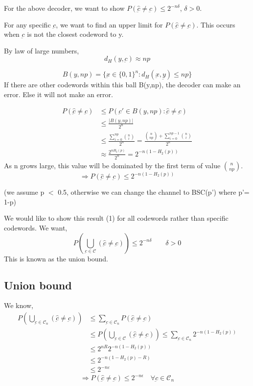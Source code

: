 \documentclass{article}
\begin{document}
For the above decoder, we want to show $P( \hat{\underbar{c}} \neq \underbar{c}) \leq 2^{-n \delta}$, $\delta >0$.

For any specific $\underbar{c}$, we want to find an upper limit for $P(\hat{\underbar{c}} \neq \underbar{c})$. This occurs when $\underbar{c}$ is not the closest codeword to y.

By law of large numbers,
$$ d_H (y, \underbar{c}) \approx np$$

$$ B(y,np)= \{ \underbar{x} \in \{ 0,1 \}^n : d_H (\underbar{x}, \underbar{y}) \leq np \}$$
If there are other codewords within this ball B(y,np), the decoder can make an error. Else it will not make an error.

\begin{align*}
P(\hat{\underbar{c}} \neq \underbar{c}) &\leq P(\underbar{c}' \in B(y,np): \hat{\underbar{c}} \neq \underbar{c} ) \\
&\leq \frac{|B(y,np)|}{2^n} \\
&\leq \frac{\sum_{i=0}^{np} {n \choose i}}{2^n} = \frac{{n \choose np} + \sum_{i=0}^{np-1} {n \choose i}}{2^n} \\
&\approx \frac{2^{n H_2(p)}}{2^n} = 2^{-n(1-H_2(p))}
\end{align*}
As n grows large, this value will be dominated by the first term of value $n \choose np$.
\begin{equation}
    \Rightarrow P(\hat{\underbar{c}} \neq \underbar{c}) \leq 2^{-n(1-H_2(p))}
\end{equation}

(we assume p $<$ 0.5, otherwise we can change the channel to BSC(p') where p'= 1-p)

We would like to show this result (1) for all codewords rather than specific codewords.
We want,
$$ P \left( \bigcup_{\underbar{c} \in \mathscr{C}}(\hat{\underbar{c}} \neq \underbar{c}) \right) \leq 2^{-n \delta} \qquad \delta > 0$$
This is known as the union bound.

\subsection{Union bound}
We know,
\begin{align*}
    P \left( \bigcup_{\underbar{c} \in \mathscr{C}_n}(\hat{\underbar{c}} \neq \underbar{c}) \right) &\leq \sum_{ \underbar{c} \in \mathscr{C}_n} P(\hat{\underbar{c}} \neq \underbar{c}) \\
    &\leq P \left( \bigcup_{\underbar{c} \in \mathscr{C}}(\hat{\underbar{c}} \neq \underbar{c}) \right) \leq \sum_{ \underbar{c} \in \mathscr{C}_n} 2^{-n(1-H_2(p))} \\
    &\leq 2^{nR}2^{-n(1-H_2(p))} \\
    &\leq 2^{-n(1-H_2(p)-R)} \\
    &\leq 2^{-n\varepsilon}
\end{align*}
$$ \Rightarrow P(\hat{\underbar{c}} \neq \underbar{c}) \leq 2^{-n\epsilon} \quad \forall \underbar{c} \in \mathscr{C}_n$$
\end{document}
